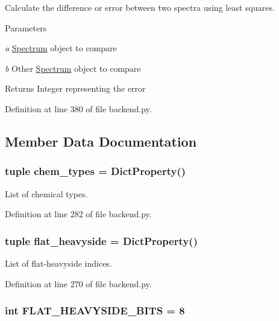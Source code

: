 Calculate the difference or error between two spectra using least squares. 
\begin{DoxyParams}{Parameters}
\item[{\em a}]\hyperlink{classbackend_1_1_spectrum}{Spectrum} object to compare \item[{\em b}]Other \hyperlink{classbackend_1_1_spectrum}{Spectrum} object to compare \end{DoxyParams}
\begin{DoxyReturn}{Returns}
Integer representing the error 
\end{DoxyReturn}


Definition at line 380 of file backend.py.

\subsection{Member Data Documentation}
\hypertarget{classbackend_1_1_matcher_aaf40dbbcd44a623683ceae35f6e5e9ea}{
\subsubsection[{chem\_\-types}]{\setlength{\rightskip}{0pt plus 5cm}tuple {\bf chem\_\-types} = {\bf DictProperty}()}}
\label{classbackend_1_1_matcher_aaf40dbbcd44a623683ceae35f6e5e9ea}


List of chemical types. 

Definition at line 282 of file backend.py.\hypertarget{classbackend_1_1_matcher_a8edb3e00a469bccb3c6a988e2162f51e}{
\subsubsection[{flat\_\-heavyside}]{\setlength{\rightskip}{0pt plus 5cm}tuple {\bf flat\_\-heavyside} = {\bf DictProperty}()}}
\label{classbackend_1_1_matcher_a8edb3e00a469bccb3c6a988e2162f51e}


List of flat-\/heavyside indices. 

Definition at line 270 of file backend.py.\hypertarget{classbackend_1_1_matcher_a489df5b5c1e345f76ee524685e0856c1}{
\subsubsection[{FLAT\_\-HEAVYSIDE\_\-BITS}]{\setlength{\rightskip}{0pt plus 5cm}int {\bf FLAT\_\-HEAVYSIDE\_\-BITS} = 8}}
\label{classbackend_1_1_matcher_a489df5b5c1e345f76ee524685e0856c1}


